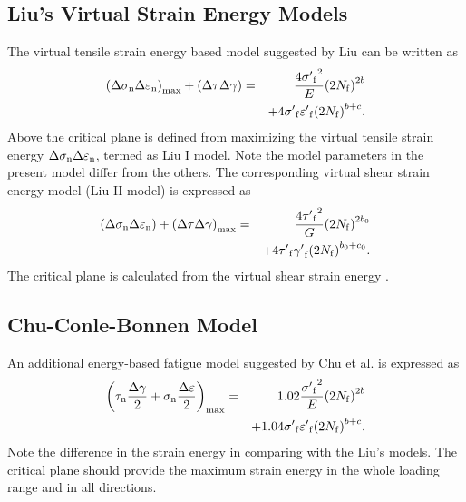 \documentclass[preprint,5p,twocolumn,11pt,sort&compress]{elsarticle}
\begin{document}
\subsection{Liu's Virtual Strain Energy Models}
The virtual tensile strain energy based model suggested by Liu \cite{Liu1993} can be written as
\begin{eqnarray*}
{\left( {\Delta {\sigma _{\rm n}}\Delta {\varepsilon _{\rm n}}} \right)_{\max }} + \left( {\Delta \tau \Delta \gamma } \right) &=& \frac{{4{{\sigma '}_{\rm f}}^2}}{E}{\left( {2{N_{\rm f}}} \right)^{2b}}
\\
& & + 4{{\sigma '}_{\rm f}}{{\varepsilon '}_{\rm f}}{\left( {2{N_{\rm f}}} \right)^{b + c}}.
\end{eqnarray*}
Above the critical plane is defined from maximizing the virtual tensile strain energy ${\Delta {\sigma _{\rm n}}\Delta {\varepsilon _{\rm n}}}$, termed as Liu I model. Note the model parameters in the present model differ from the others. The corresponding virtual shear strain energy model (Liu II model) is expressed as
\begin{eqnarray*}
\left( {\Delta {\sigma _{\rm n}}\Delta {\varepsilon _{\rm n}}} \right) + {\left( {\Delta \tau \Delta \gamma } \right)_{\max }} &=& \frac{{4{{\tau '}_{\rm f}}^2}}{G}{\left( {2{N_{\rm f}}} \right)^{2b_0 }}
\\
&& + 4{{\tau '}_{\rm f}}{{\gamma '}_{\rm f}}{\left( {2{N_{\rm f}}} \right)^{b_0  + c_0 }}.
\end{eqnarray*}
The critical plane is calculated from the virtual shear strain energy \cite{Liu1993}.

\subsection{Chu-Conle-Bonnen Model}
An additional energy-based fatigue model suggested by Chu et al. \cite{Chu1993} is expressed as
\begin{eqnarray*}
{\left( {{\tau _{\rm n}}\frac{{\Delta \gamma }}{2} + {\sigma _{\rm n }}\frac{{\Delta \varepsilon }}{2}} \right)_{\max }} &=& 1.02\frac{{{{\sigma '}_{\rm f}}^2}}{E}{\left( {2{N_{\rm f}}} \right)^{2b}} \\
&& + 1.04{{\sigma '}_{\rm f}}{{\varepsilon '}_{\rm f}}{\left( {2{N_{\rm f}}} \right)^{b + c}}.
\end{eqnarray*}
Note the difference in the strain energy in comparing with the Liu's models. The critical plane should provide the maximum strain energy in the whole loading range and in all directions.
 
\end{document}
